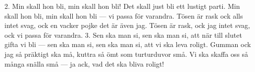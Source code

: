 2.  Min skall hon bli, min skall hon bli!
    Det skall just bli ett lustigt parti.
    Min skall hon bli, min skall hon bli —
    vi passa för varandra.
    Tösen är rask ock alls intet svag,
    ock en vacker pojke det är även jag.
    Tösen är rask, ock jag intet svag,
    ock vi passa för varandra.
3.  Sen ska man si, sen ska man si,
    att när till slutet gifta vi bli —
    sen ska man si, sen ska man si,
    att vi ska leva roligt.
    Gumman ock jag så präktigt ska må,
    kuttra så ömt som turturduvor små.
    Vi ska skaffa oss så många snälla små —
    ja ack, vad det ska bliva roligt!
